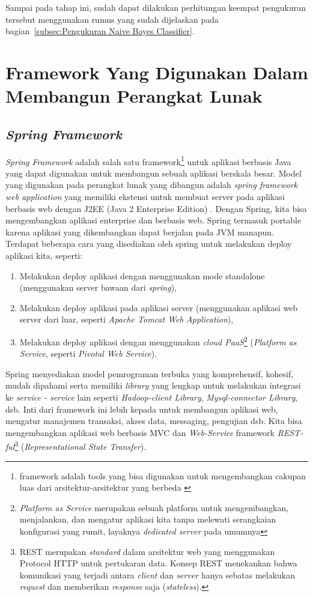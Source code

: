 Sampai pada tahap ini, sudah dapat dilakukan perhitungan keempat pengukuran tersebut menggunakan rumus yang sudah dijelaskan pada bagian~\ref{subsec:Pengukuran Naive Bayes Classifier}.
	
\section{Framework Yang Digunakan Dalam Membangun Perangkat Lunak}

\subsection{\textit{Spring Framework}}
\label{subsec:Spring Framework}

\textit{Spring Framework} adalah salah satu framework\footnote{framework adalah tools yang bisa digunakan untuk mengembangkan cakupan luas dari arsitektur-arsitektur yang berbeda \cite{setiawan2009pemilihan}} untuk aplikasi berbasis Java yang dapat digunakan untuk membangun sebuah aplikasi berskala besar. Model yang digunakan pada perangkat lunak yang dibangun adalah \textit{spring framework web application} yang memiliki ekstensi untuk membuat server pada aplikasi berbasis web dengan J2EE (Java 2 Enterprise Edition) \cite{SpringCommerceToha:2010}. Dengan Spring, kita bisa mengembangkan aplikasi enterprise dan berbasis web. Spring termasuk portable karena aplikasi yang dikembangkan dapat berjalan pada JVM manapun. Terdapat beberapa cara yang disediakan oleh spring untuk melakukan deploy aplikasi kita, seperti: 
\begin{enumerate}
	\item Melakukan deploy aplikasi dengan menggunakan mode standalone (menggunakan server bawaan dari \textit{spring}),
	\item Melakukan deploy aplikasi pada aplikasi server (menggunakan aplikasi web server dari luar, seperti \textit{Apache Tomcat Web Application}),
	\item Melakukan deploy aplikasi dengan menggunakan \textit{cloud PaaS}\footnote{\textit{Platform as Service} merupakan sebuah platform untuk mengembangkan, menjalankan, dan mengatur aplikasi kita tanpa melewati serangkaian konfigurasi yang rumit, layaknya \textit{dedicated server} pada umumnya} (\textit{Platform as Service}, seperti \textit{Pivotal Web Service}).
\end{enumerate}
Spring menyediakan model pemrograman terbuka yang komprehensif, kohesif, mudah dipahami serta memiliki \textit{library} yang lengkap untuk melakukan integrasi ke \textit{service - service} lain seperti \textit{Hadoop-client Library}, \textit{Mysql-connector Library}, dsb. Inti dari framework ini lebih kepada untuk membangun aplikasi web, mengatur manajemen transaksi, akses data, messaging, pengujian dsb. Kita bisa mengembangkan aplikasi web berbasis MVC dan \textit{Web-Service} framework \textit{REST-ful}\footnote{REST merupakan \textit{standard} dalam arsitektur web yang menggunakan Protocol HTTP untuk pertukaran data.  Konsep REST menekankan bahwa komunikasi yang terjadi antara \textit{client} dan \textit{server} hanya sebatas melakukan \textit{request} dan memberikan \textit{response} saja (\textit{stateless}).} (\textit{Representational State Transfer}).


